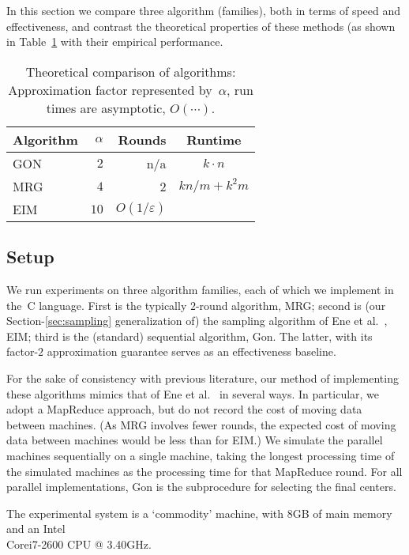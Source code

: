 \documentclass[11pt]{article}
\newcommand{\eps}{\ensuremath{\varepsilon}}
\newcommand{\ours}{{\sc MRG}\xspace}
\newcommand{\ene}{{\sc EIM}\xspace}
\newcommand{\gon}{{\sc Gon}\xspace}
\begin{document}
In this section we compare three algorithm (families), both in terms of speed
and effectiveness, and contrast the theoretical properties of these methods
(as shown in Table~\ref{table_compare}
with their empirical performance.

\begin{table}[!t]
\renewcommand{\arraystretch}{1.4}
\caption{Theoretical comparison of algorithms: Approximation factor
represented by~$\alpha$, run times are asymptotic, $O(\cdots)$.}
\label{table_compare}
\centering
\begin{tabular}{l|r|r|c}
\hline
Algorithm    & 
$\alpha$
& Rounds & Runtime \\
\hline
GON~\cite{gonzalez1985clustering} 
	& $2$  
		& n/a    
			& $k\cdot n$  \\
\ours 
	& $4$    
 		& 2 
			& $kn/m + k^2m$ \\[1mm]
\ene~\cite{ene2011fast}
	& $10$
		& $O(1 / \eps )$ 
			& \pbox{20cm}{\small $\displaystyle \frac{kn^{1+\eps}\log
				n}{m(1-{n^{-\eps}})^2}$} \\
\end{tabular}
\end{table}


\subsection{Setup}
We run experiments on three algorithm families, each of which we implement in the~C language.
First is the typically $2$-round algorithm, \ours;
second is (our Section-\ref{sec:sampling} generalization of) the sampling algorithm
of Ene et al.~\cite{ene2011fast}, \ene;
third is the (standard) sequential algorithm, \gon.
The latter, with its factor-$2$ approximation guarantee serves as an
effectiveness baseline.

For the sake of consistency with previous literature,
our method of implementing these algorithms mimics that of
Ene et al.~\cite{ene2011fast} in several ways.
In particular, we adopt a MapReduce approach, but do not record the cost of moving data between machines.
(As \ours involves fewer rounds, the expected cost of moving data between
machines would be less than for \ene.)
We simulate the parallel machines sequentially on a single machine,
taking the longest processing time of the simulated machines
as the processing time for that MapReduce round. 
For all parallel implementations, \gon is the subprocedure for selecting the final centers. 

The experimental system is a `commodity' machine,
with 8GB of main memory and an Intel\textregistered \\
Core\texttrademark i7-2600 CPU @ 3.40GHz.
\end{document}
